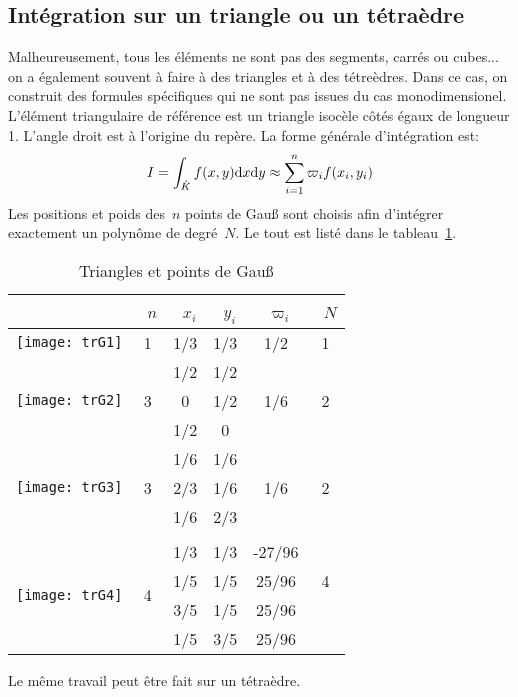 \subsection*{Intégration sur un triangle ou un tétraèdre} 
Malheureusement, tous les éléments ne sont pas des segments, carrés ou cubes... on a également souvent à faire à des triangles et à des tétreèdres. Dans ce cas, on construit des formules spécifiques qui ne sont pas issues du cas monodimensionel. L'élément triangulaire de référence est un triangle isocèle côtés égaux de longueur 1. L'angle droit est à l'origine du repère. La forme générale d'intégration est: 
\begin{equation}
 I=\int_{\hat{K}} f(x,y)\text{d} x\text{d} y \approx \sum_{i=1}^n \varpi_if(x_i,y_i) 
\end{equation}
Les positions et poids des~$n$ points de Gauß sont choisis afin d'intégrer exactement un polynôme de degré~$N$. Le tout est listé dans le tableau~\ref{tab:IntNum:TriGauss}.
\begin{table}[ht]\centering
\begin{tabular}{cccccc} &~$n$ &~$x_i$ &~$y_i$ &~$\varpi_i$ &~$N$\\ \hline \texttt{[image: trG1]} & 1 & 1/3 & 1/3 & 1/2 & 1\\ \hline \multirow{3}{*}{\texttt{[image: trG2]}} & \multirow{3}{*}{3} & 1/2 & 1/2 & \multirow{3}{*}{1/6} & \multirow{3}{*}{2}\\[+2mm] &&0&1/2&&\\[+2mm] &&1/2&0&&\\[+2mm] \hline \multirow{3}{*}{\texttt{[image: trG3]}} & \multirow{3}{*}{3} & 1/6 & 1/6 & \multirow{3}{*}{1/6} & \multirow{3}{*}{2}\\[+2mm] &&2/3 & 1/6 &&\\[+2mm] &&1/6&2/3&&\\[+2mm] \\ \hline \multirow{4}{*}{\texttt{[image: trG4]}} & \multirow{4}{*}{4} & 1/3 & 1/3 & -27/96 & \multirow{3}{*}{4}\\[+2mm] &&1/5&1/5&25/96&\\[+2mm] &&3/5&1/5&25/96&\\[+2mm] &&1/5&3/5&25/96&\\[+2mm] 
\end{tabular} 
\caption{Triangles et points de Gauß}\label{tab:IntNum:TriGauss}
\end{table} 
 Le même travail peut être fait sur un tétraèdre. 